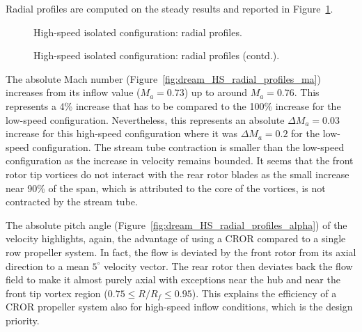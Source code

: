Radial profiles are computed on the steady results and 
reported in Figure~\ref{fig:dream_HS_radial_profiles}.
\begin{figure}[htp]
  \centering
  \caption{High-speed isolated configuration: radial profiles.}
\end{figure}
\begin{figure}[htp]
  \centering
  \setcounter{subfigure}{3}
  \caption{High-speed isolated configuration: radial profiles (contd.).}
  \label{fig:dream_HS_radial_profiles}
\end{figure}

The absolute Mach number (Figure~\ref{fig:dream_HS_radial_profiles_ma}) 
increases from its inflow
value ($M_a = 0.73$) up to around $M_a=0.76$. This represents
a 4\% increase that has to be compared to the 100\% increase
for the low-speed configuration. Nevertheless, this represents
an absolute $\Delta M_a = 0.03$ increase for this high-speed
configuration where it was $\Delta M_a = 0.2$
for the low-speed configuration. The stream tube contraction
is smaller than the low-speed configuration 
as the increase in velocity remains bounded.
It seems that the front rotor tip vortices do not interact
with the rear rotor blades as the small increase near 90\%
of the span, which is attributed to the core of the vortices,
is not contracted by the stream tube.

The absolute pitch angle (Figure~\ref{fig:dream_HS_radial_profiles_alpha}) 
of the velocity highlights, again, the advantage
of using a CROR compared to a single row propeller system. In fact,
the flow is deviated by the front rotor from its axial direction
to a mean $5^\circ$ velocity vector. The rear rotor then deviates
back the flow field to make it almost purely axial with exceptions
near the hub and near the front tip vortex region ($0.75 \leq R/R_f \leq 0.95$).
This explains the efficiency of a CROR propeller system also for high-speed
inflow conditions, which is the design priority.

